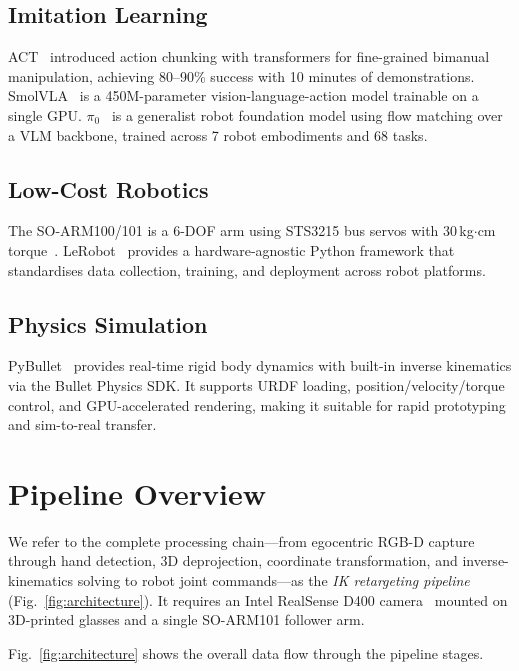 \documentclass{ieeeaccess}
\begin{document}
\subsection{Imitation Learning}
ACT~\cite{zhao2023act} introduced action chunking with transformers for
fine-grained bimanual manipulation, achieving 80--90\% success with
10 minutes of demonstrations. SmolVLA~\cite{cadena2025smolvla} is a
450M-parameter vision-language-action model trainable on a single GPU.
$\pi_0$~\cite{black2024pi0} is a generalist robot foundation model
using flow matching over a VLM backbone, trained across 7 robot
embodiments and 68 tasks.

\subsection{Low-Cost Robotics}
The SO-ARM100/101 is a 6-DOF arm using STS3215 bus servos
with 30\,kg$\cdot$cm torque~\cite{soarm100}. LeRobot~\cite{lerobot2024}
provides a hardware-agnostic Python framework that standardises data
collection, training, and deployment across robot platforms.

\subsection{Physics Simulation}
PyBullet~\cite{coumans2021pybullet} provides real-time rigid body
dynamics with built-in inverse kinematics via the Bullet Physics SDK.
It supports URDF loading, position/velocity/torque control, and
GPU-accelerated rendering, making it suitable for rapid prototyping
and sim-to-real transfer.

\section{Pipeline Overview}
\label{sec:pipeline}

We refer to the complete processing chain---from egocentric RGB-D
capture through hand detection, 3D deprojection, coordinate
transformation, and inverse-kinematics solving to robot joint
commands---as the \emph{IK retargeting pipeline}
(Fig.~\ref{fig:architecture}). It requires an Intel RealSense
D400 camera~\cite{keselman2017realsense} mounted on 3D-printed glasses
and a single SO-ARM101 follower arm.

Fig.~\ref{fig:architecture} shows the overall data flow through the
pipeline stages.
\end{document}
